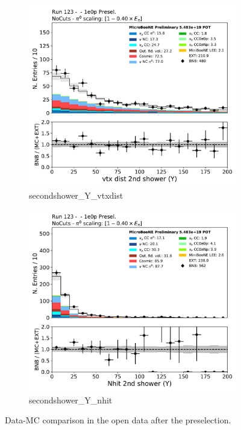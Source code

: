 \begin{figure}[H] 
\begin{center}
    \begin{subfigure}[b]{0.3\textwidth}
    \centering
    \includegraphics[width=1.00\textwidth]{1e0p/dataMCRun123/secondshower_Y_vtxdist.pdf}
    \caption{\label{fig:1e0p:dataMCRun1:secondshower_Y_vtxdist} secondshower\_Y\_vtxdist }
    \end{subfigure}
    \begin{subfigure}[b]{0.3\textwidth}
    \centering
    \includegraphics[width=1.00\textwidth]{1e0p/dataMCRun123/secondshower_Y_nhit.pdf}
    \caption{\label{fig:1e0p:dataMCRun1:secondshower_Y_nhit} secondshower\_Y\_nhit }
    \end{subfigure}
\caption{\label{fig:1e0p:dataMCRun1:pi01}Data-MC comparison in the open data after the \zpsel preselection.}
\end{center}
\end{figure}


